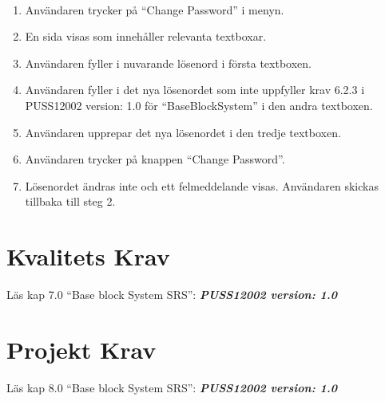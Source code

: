 \documentclass[paper=a4, fontsize=11pt,twoside]{article}
\begin{document}
\paragraph{}
  \begin{enumerate}
 \item  Användaren trycker på “Change Password” i menyn.
 \item	 En sida visas som innehåller relevanta textboxar.
 \item	Användaren fyller i nuvarande lösenord i första textboxen.
 \item	Användaren fyller i det nya lösenordet som inte uppfyller krav 6.2.3 i PUSS12002 version: 1.0 för “BaseBlockSystem” i den andra textboxen.
 \item	Användaren upprepar det nya lösenordet i den tredje textboxen.
 \item	Användaren trycker på knappen “Change Password”.
 \item	Lösenordet ändras inte och ett felmeddelande visas. Användaren skickas tillbaka till steg 2.
  	
  \end{enumerate}
 
\section{Kvalitets Krav}
Läs kap 7.0  “Base block System SRS”:   \textbf{\textit{PUSS12002 version: 1.0}} 
\section{Projekt Krav}
Läs kap 8.0  “Base block System SRS”:   \textbf{\textit{PUSS12002 version: 1.0}} 
\end{document}
